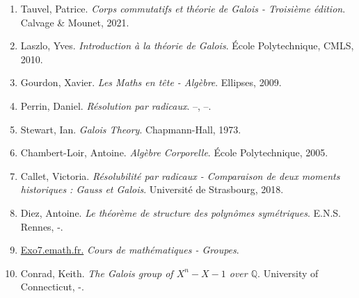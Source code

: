 \documentclass[5pt,a4paper]{article}
\begin{document}
\begin{onehalfspacing}
\begin{enumerate}
\item Tauvel, Patrice. \textit{Corps commutatifs et théorie de Galois - Troisième édition}. Calvage \& Mounet, 2021.
\item Laszlo, Yves. \textit{Introduction à la théorie de Galois}. École Polytechnique, CMLS, 2010.
\item Gourdon, Xavier. \textit{Les Maths en tête - Algèbre}. Ellipses, 2009.
\item Perrin, Daniel. \textit{Résolution par radicaux}. --, --.
\item Stewart, Ian. \textit{Galois Theory}. Chapmann-Hall, 1973.
\item Chambert-Loir, Antoine. \textit{Algèbre Corporelle}. École Polytechnique, 2005.
\item Callet, Victoria. \textit{Résolubilité par radicaux - Comparaison de deux moments historiques : Gauss et Galois}. Université de Strasbourg, 2018.
\item Diez, Antoine. \textit{Le théorème de structure des polynômes symétriques}. E.N.S. Rennes, -.
\item \href{http://exo7.emath.fr/cours/ch_groupe.pdf}{Exo7.emath.fr.} \textit{Cours de mathématiques - Groupes}. 
\item Conrad, Keith. \textit{The Galois group of $X^n - X - 1$ over $\mathbb{Q}$}. University of Connecticut, -.
\end{enumerate}

\end{onehalfspacing}
\end{document}

